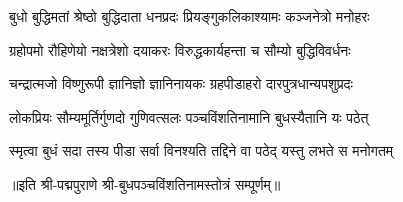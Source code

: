 

\twolineshloka
{बुधो बुद्धिमतां श्रेष्ठो बुद्धिदाता धनप्रदः}
{प्रियङ्गुकलिकाश्यामः कञ्जनेत्रो मनोहरः}

\twolineshloka
{ग्रहोपमो रौहिणेयो नक्षत्रेशो दयाकरः}
{विरुद्धकार्यहन्ता च सौम्यो बुद्धिविवर्धनः}

\twolineshloka
{चन्द्रात्मजो विष्णुरूपी ज्ञानिज्ञो ज्ञानिनायकः}
{ग्रहपीडाहरो दारपुत्रधान्यपशुप्रदः}

\twolineshloka
{लोकप्रियः सौम्यमूर्तिर्गुणदो गुणिवत्सलः}
{पञ्चविंशतिनामानि बुधस्यैतानि यः पठेत्}

\twolineshloka
{स्मृत्वा बुधं सदा तस्य पीडा सर्वा विनश्यति}
{तद्दिने वा पठेद् यस्तु लभते स मनोगतम्}

॥इति श्री-पद्मपुराणे श्री-बुधपञ्चविंशतिनामस्तोत्रं सम्पूर्णम्॥
